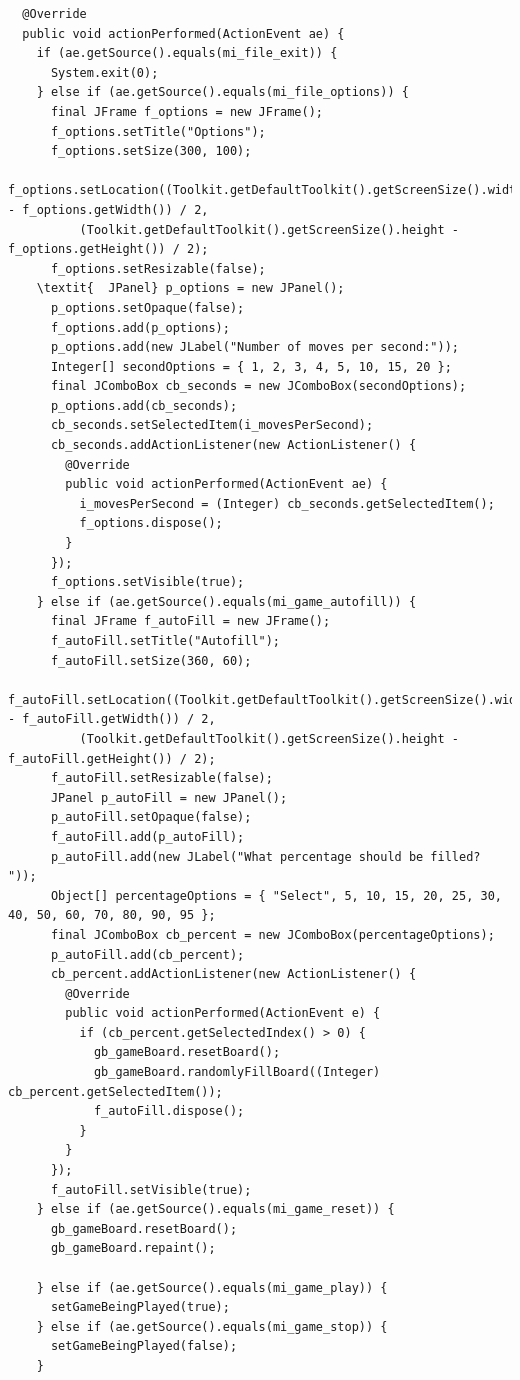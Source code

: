 \documentclass[12pt]{article}
\begin{document}
\begin{lstlisting}
  @Override
  public void actionPerformed(ActionEvent ae) {
    if (ae.getSource().equals(mi_file_exit)) {
      System.exit(0);
    } else if (ae.getSource().equals(mi_file_options)) {
      final JFrame f_options = new JFrame();
      f_options.setTitle("Options");
      f_options.setSize(300, 100);
      f_options.setLocation((Toolkit.getDefaultToolkit().getScreenSize().width - f_options.getWidth()) / 2,
          (Toolkit.getDefaultToolkit().getScreenSize().height - f_options.getHeight()) / 2);
      f_options.setResizable(false);
    \textit{  JPanel} p_options = new JPanel();
      p_options.setOpaque(false);
      f_options.add(p_options);
      p_options.add(new JLabel("Number of moves per second:"));
      Integer[] secondOptions = { 1, 2, 3, 4, 5, 10, 15, 20 };
      final JComboBox cb_seconds = new JComboBox(secondOptions);
      p_options.add(cb_seconds);
      cb_seconds.setSelectedItem(i_movesPerSecond);
      cb_seconds.addActionListener(new ActionListener() {
        @Override
        public void actionPerformed(ActionEvent ae) {
          i_movesPerSecond = (Integer) cb_seconds.getSelectedItem();
          f_options.dispose();
        }
      });
      f_options.setVisible(true);
    } else if (ae.getSource().equals(mi_game_autofill)) {
      final JFrame f_autoFill = new JFrame();
      f_autoFill.setTitle("Autofill");
      f_autoFill.setSize(360, 60);
      f_autoFill.setLocation((Toolkit.getDefaultToolkit().getScreenSize().width - f_autoFill.getWidth()) / 2,
          (Toolkit.getDefaultToolkit().getScreenSize().height - f_autoFill.getHeight()) / 2);
      f_autoFill.setResizable(false);
      JPanel p_autoFill = new JPanel();
      p_autoFill.setOpaque(false);
      f_autoFill.add(p_autoFill);
      p_autoFill.add(new JLabel("What percentage should be filled? "));
      Object[] percentageOptions = { "Select", 5, 10, 15, 20, 25, 30, 40, 50, 60, 70, 80, 90, 95 };
      final JComboBox cb_percent = new JComboBox(percentageOptions);
      p_autoFill.add(cb_percent);
      cb_percent.addActionListener(new ActionListener() {
        @Override
        public void actionPerformed(ActionEvent e) {
          if (cb_percent.getSelectedIndex() > 0) {
            gb_gameBoard.resetBoard();
            gb_gameBoard.randomlyFillBoard((Integer) cb_percent.getSelectedItem());
            f_autoFill.dispose();
          }
        }
      });
      f_autoFill.setVisible(true);
    } else if (ae.getSource().equals(mi_game_reset)) {
      gb_gameBoard.resetBoard();
      gb_gameBoard.repaint();

    } else if (ae.getSource().equals(mi_game_play)) {
      setGameBeingPlayed(true);
    } else if (ae.getSource().equals(mi_game_stop)) {
      setGameBeingPlayed(false);
    }


\end{lstlisting}
\end{document}

